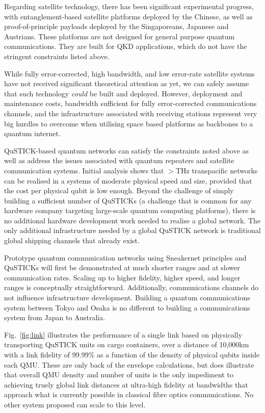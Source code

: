 \documentclass[twocolumn, aps, rmp, amsmath, amssymb, nofootinbib, superscriptaddress, longbibliography, floatfix, table-of-contents, eqsecnum]{revtex4-2}
\begin{document}
Regarding satellite technology, there has been significant experimental progress, with entanglement-based satellite platforms deployed by the Chinese, as well as proof-of-principle payloads deployed by the Singaporeans, Japanese and Austrians. These platforms are not designed for general purpose quantum communications. They are built for QKD applications, which do not have the stringent constraints listed above. 

While fully error-corrected, high bandwidth, and low error-rate satellite systems have not received significant theoretical attention as yet, we can safely assume that such technology \textit{could} be built and deployed. However, deployment and maintenance costs, bandwidth sufficient for fully error-corrected communications channels, and the infrastructure associated with receiving stations represent very big hurdles to overcome when utilising space based platforms as backbones to a quantum internet. 

QuSTICK-based quantum networks can satisfy the constraints noted above as well as address the issues associated with quantum repeaters and satellite communication systems. Initial analysis shows that $>$THz transpacific networks can be realised in a systems of moderate physical speed and size, provided that the cost per physical qubit is low enough. Beyond the challenge of simply building a sufficient number of QuSTICKs (a challenge that is common for any hardware company targeting large-scale quantum computing platforms), there is no additional hardware development work needed to realise a global network. The only additional infrastructure needed by a global QuSTICK network is traditional global shipping channels that already exist. 

Prototype quantum communication networks using Sneakernet principles and QuSTICKs will first be demonstrated at much shorter ranges and at slower communication rates. Scaling up to higher fidelity, higher speed, and longer ranges is conceptually straightforward. Additionally, communications channels do not influence infrastructure development. Building a quantum communications system between Tokyo and Osaka is no different to building a communications system from Japan to Australia. 

Fig.~\ref{fig:link} illustrates the performance of a single link based on physically transporting QuSTICK units on cargo containers, over a distance of 10,000km with a link fidelity of 99.99\% as a function of the density of physical qubits inside each QMU. These are only back of the envelope calculations, but does illustrate that overall QMU density and number of units is the only impediment to achieving truely global link distances at ultra-high fidelity at bandwidths that approach what is currently possible in classical fibre optics communications. No other system proposed can scale to this level.
 
\end{document}
